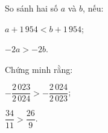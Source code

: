 \begin{exercises}
\begin{questions}[resume=SGK]
\begin{questions}
            \answerline
        \end{questions}

        \item So sánh hai số $a$ và $b$, nếu:
        \begin{questions}
            \item $a+1\,954<b+1\,954$;

            \answerline
            \item $-2a>-2b$.

            \answerline
        \end{questions}

        \item Chứng minh rằng:
        \begin{questions}
            \item $-\dfrac{2\,023}{2\,024}>-\dfrac{2\,024}{2\,023}$;

            \answerline
            \item $\dfrac{34}{11}>\dfrac{26}{9}$.

            \answerline
        \end{questions}
    \end{questions}
\end{exercises}

